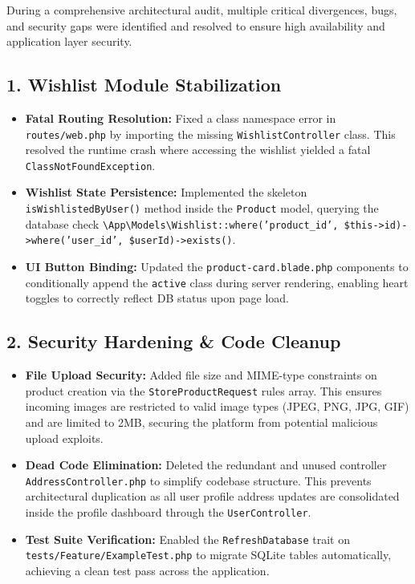 \documentclass[12pt,a4paper]{article}
\begin{document}
During a comprehensive architectural audit, multiple critical divergences, bugs, and security gaps were identified and resolved to ensure high availability and application layer security.

\subsection{1. Wishlist Module Stabilization}
\begin{itemize}
    \item \textbf{Fatal Routing Resolution:} Fixed a class namespace error in \texttt{routes/web.php} by importing the missing \texttt{WishlistController} class. This resolved the runtime crash where accessing the wishlist yielded a fatal \texttt{ClassNotFoundException}.
    \item \textbf{Wishlist State Persistence:} Implemented the skeleton \texttt{isWishlistedByUser()} method inside the \texttt{Product} model, querying the database check \texttt{\textbackslash App\textbackslash Models\textbackslash Wishlist::where('product\_id', \$this->id)->where('user\_id', \$userId)->exists()}.
    \item \textbf{UI Button Binding:} Updated the \texttt{product-card.blade.php} components to conditionally append the \texttt{active} class during server rendering, enabling heart toggles to correctly reflect DB status upon page load.
\end{itemize}

\subsection{2. Security Hardening \& Code Cleanup}
\begin{itemize}
    \item \textbf{File Upload Security:} Added file size and MIME-type constraints on product creation via the \texttt{StoreProductRequest} rules array. This ensures incoming images are restricted to valid image types (JPEG, PNG, JPG, GIF) and are limited to 2MB, securing the platform from potential malicious upload exploits.
    \item \textbf{Dead Code Elimination:} Deleted the redundant and unused controller \texttt{AddressController.php} to simplify codebase structure. This prevents architectural duplication as all user profile address updates are consolidated inside the profile dashboard through the \texttt{UserController}.
    \item \textbf{Test Suite Verification:} Enabled the \texttt{RefreshDatabase} trait on \texttt{tests/Feature/ExampleTest.php} to migrate SQLite tables automatically, achieving a clean test pass across the application.
\end{itemize}
\end{document}
